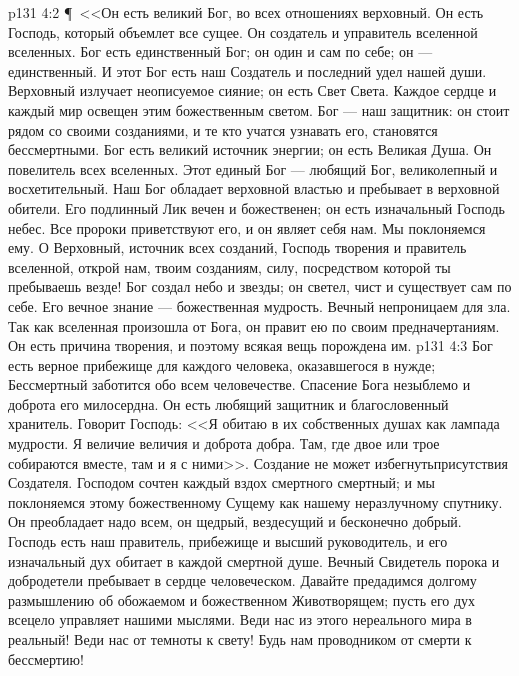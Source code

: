 \vs p131 4:2 \P\ <<Он есть великий Бог, во всех отношениях верховный. Он есть Господь, который объемлет все сущее. Он создатель и управитель вселенной вселенных. Бог есть единственный Бог; он один и сам по себе; он --- единственный. И этот Бог есть наш Создатель и последний удел нашей души. Верховный излучает неописуемое сияние; он есть Свет Света. Каждое сердце и каждый мир освещен этим божественным светом. Бог --- наш защитник: он стоит рядом со своими созданиями, и те кто учатся узнавать его, становятся бессмертными. Бог есть великий источник энергии; он есть Великая Душа. Он повелитель всех вселенных. Этот единый Бог --- любящий Бог, великолепный и восхетительный. Наш Бог обладает верховной властью и пребывает в верховной обители. Его подлинный Лик вечен и божественен; он есть изначальный Господь небес. Все пророки приветствуют его, и он являет себя нам. Мы поклоняемся ему. О Верховный, источник всех созданий, Господь творения и правитель вселенной, открой нам, твоим созданиям, силу, посредством которой ты пребываешь везде! Бог создал небо и звезды; он светел, чист и существует сам по себе. Его вечное знание --- божественная мудрость. Вечный непроницаем для зла. Так как вселенная произошла от Бога, он правит ею по своим предначертаниям. Он есть причина творения, и поэтому всякая вещь порождена им.
\vs p131 4:3 Бог есть верное прибежище для каждого человека, оказавшегося в нужде; Бессмертный заботится обо всем человечестве. Спасение Бога незыблемо и доброта его милосердна. Он есть любящий защитник и благословенный хранитель. Говорит Господь: <<Я обитаю в их собственных душах как лампада мудрости. Я величие величия и доброта добра. Там, где двое или трое собираются вместе, там и я с ними>>. Создание не может избегнутьприсутствия Создателя. Господом сочтен каждый вздох смертного смертный; и мы поклоняемся этому божественному Сущему как нашему неразлучному спутнику. Он преобладает надо всем, он щедрый, вездесущий и бесконечно добрый. Господь есть наш правитель, прибежище и высший руководитель, и его изначальный дух обитает в каждой смертной душе. Вечный Свидетель порока и добродетели пребывает в сердце человеческом. Давайте предадимся долгому размышлению об обожаемом и божественном Животворящем; пусть его дух всецело управляет нашими мыслями. Веди нас из этого нереального мира в реальный! Веди нас от темноты к свету! Будь нам проводником от смерти к бессмертию!
